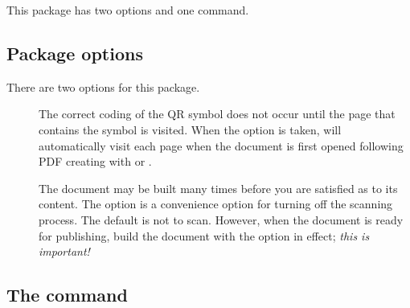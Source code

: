 \documentclass{article}
\begin{document}
This package has two options and one command.

\subsection{Package options}

There are two options for this package.
\begin{description}
    \item[] The correct coding of the QR symbol does not occur
        until the page that contains the symbol is visited. When the
         option is taken,  will automatically
        visit each page when the document is first opened following PDF
        creating with  or .
    \item[] The document may be built many times before you
        are satisfied as to its content. The  option is a
        convenience option for turning off the scanning process. The
        default is not to scan. However, when the document is ready for
        publishing, build the document with the  option in
        effect; \emph{this is important!}
\end{description}

\subsection{The \texorpdfstring{\protect{}}{\textbackslash{qrCode}} command}
\end{document}
